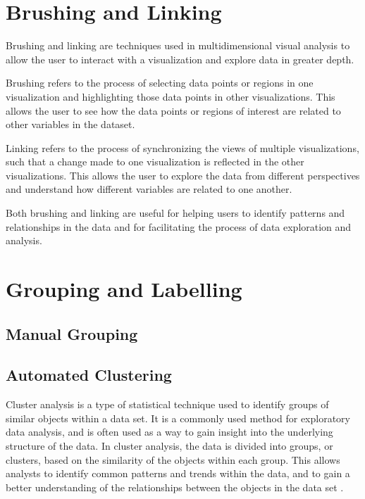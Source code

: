 \section{Brushing and Linking}

Brushing and linking are techniques used in multidimensional visual
analysis to allow the user to interact with a visualization and
explore data in greater depth.

Brushing refers to the process of selecting data points or regions in
one visualization and highlighting those data points in other
visualizations. This allows the user to see how the data points or
regions of interest are related to other variables in the dataset.

Linking refers to the process of synchronizing the views of multiple
visualizations, such that a change made to one visualization is
reflected in the other visualizations. This allows the user to explore
the data from different perspectives and understand how different
variables are related to one another.

Both brushing and linking are useful for helping users to identify
patterns and relationships in the data and for facilitating the
process of data exploration and analysis.






\section{Grouping and Labelling}


\subsection{Manual Grouping}



\subsection{Automated Clustering}

Cluster analysis is a type of statistical technique used to identify
groups of similar objects within a data set. It is a commonly used
method for exploratory data analysis, and is often used as a way to
gain insight into the underlying structure of the data. In cluster
analysis, the data is divided into groups, or clusters, based on the
similarity of the objects within each group. This allows analysts to
identify common patterns and trends within the data, and to gain a
better understanding of the relationships between the objects in the
data set \parencite{duran2013cluster}.



